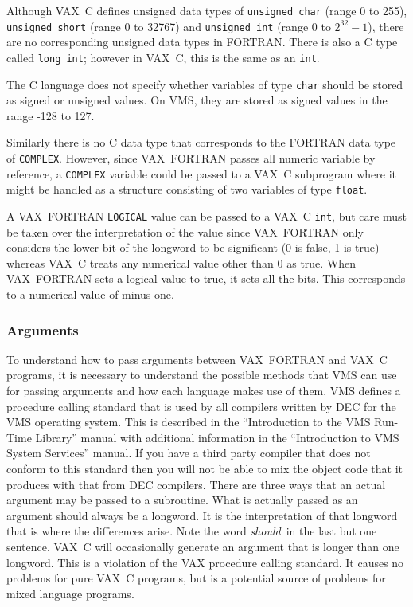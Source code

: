 \documentclass[twoside,11pt]{article}
\renewcommand{\_}{\texttt{\symbol{95}}}
\begin{document}
Although VAX~C defines unsigned data types of \texttt{unsigned char} (range 0 
to 255),  \texttt{unsigned short} (range 0 to 32767) and \texttt{unsigned int} 
(range 0 to $2^{32}-1$), there are no corresponding unsigned data types in 
FORTRAN\@.
There is also a C type called \texttt{long int}; however in VAX~C, this is the
same as an \texttt{int}.

The C language does not specify whether variables of type \texttt{char} should be
stored as signed or unsigned values. On VMS, they are stored as signed
values in the range -128 to 127.

Similarly there is no C data type that corresponds to the FORTRAN data type of
\texttt{COMPLEX}\@.
However, since VAX~FORTRAN passes all numeric variable by reference, a
\texttt{COMPLEX} variable could be passed to a VAX~C subprogram where it might 
be handled as a structure consisting of two variables of type \texttt{float}.

A VAX~FORTRAN \texttt{LOGICAL} value can be passed to a VAX~C \texttt{int}, but 
care must be taken over the interpretation of the value since VAX~FORTRAN only 
considers the lower bit of the longword to be significant (0 is false, 1 is 
true) whereas VAX~C treats any numerical value other than 0 as true. 
When VAX~FORTRAN sets a
logical value to true, it sets all the bits. This corresponds to a numerical
value of minus one.

\subsubsection{\label{vms_arg}Arguments}

To understand how to pass arguments between VAX~FORTRAN and VAX~C programs, it
is necessary to understand the possible methods that VMS can use for passing
arguments and how each language makes use of them. VMS defines a procedure
calling standard that is used by all compilers written by DEC for the VMS
operating system. This is described in the ``Introduction to the VMS Run-Time
Library'' manual with additional information in the ``Introduction to VMS System
Services'' manual. If you have a third party compiler that does not conform to
this standard then you will not be able to mix the object code that it produces
with that from DEC compilers. There are three ways that an actual argument may
be passed to a subroutine. What is actually passed as an argument should always
be a longword. It is the interpretation of that longword that is where the
differences arise. Note the word \textit{should}\, in the last but one sentence.
VAX~C will occasionally generate an argument that is longer than one longword.
This is a violation of the VAX procedure calling standard. It causes no
problems for pure VAX~C programs, but is a potential source of problems for
mixed language programs.
\end{document}

